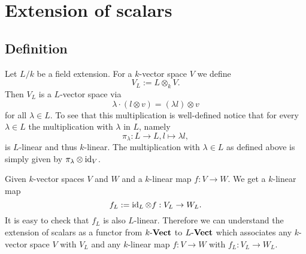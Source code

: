 \appendix
\appendixpage
\addappheadtotoc





\chapter{Extension of scalars}





\section{Definition}


Let $L/k$ be a field extension. For a $k$-vector space $V$ we define
\[
 V_L := L \otimes_k V.
\]
Then $V_L$ is a $L$-vector space via
\[
 \lambda \cdot (l \otimes v) = (\lambda l) \otimes v
\]
for all $\lambda \in L$. To see that this multiplication is well-defined notice that for every $\lambda \in L$ the multiplication with $\lambda$ in $L$, namely
\[
 \pi_\lambda : L \to L, l \mapsto \lambda l,
\]
is $L$-linear and thus $k$-linear. The multiplication with $\lambda \in L$ as defined above is simply given by $\pi_\lambda \otimes \operatorname{id}_V$.

Given $k$-vector spaces $V$ and $W$ and a $k$-linear map $f : V \to W$. We get a $k$-linear map
\[
 f_L := \operatorname{id}_L \otimes f : V_L \to W_L.
\]
It is easy to check that $f_L$ is also $L$-linear. Therefore we can understand the extension of scalars as a functor from $k\text{-}\mathbf{Vect}$ to $L\text{-}\mathbf{Vect}$ which associates any $k$-vector space $V$ with $V_L$ and any $k$-linear map $f : V \to W$ with $f_L : V_L \to W_L$.




